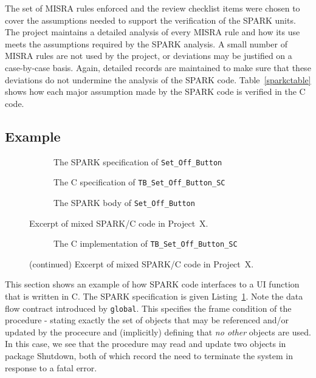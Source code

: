 \documentclass{llncs}
\newcommand{\spark}{SPARK\xspace}
\newcommand{\projectx}{Project~X\xspace}
\begin{document}
The set of MISRA rules enforced and the review checklist items
were chosen to cover the assumptions needed to support the
verification of the \spark units. The project maintains a detailed
analysis of every MISRA rule and how its use meets the assumptions
required by the \spark analysis. A small number of MISRA rules are
not used by the project, or deviations may be justified
on a case-by-case basis.  Again, detailed records are maintained
to make sure that these deviations do not undermine the analysis
of the \spark code. Table~\ref{sparkctable} shows how each major assumption
made by the \spark code is verified in the C code.

\subsection{Example}

\begin{figure}[p]
\begin{subfigure}{\linewidth}

\caption{The \spark specification of \texttt{Set\_Off\_Button}}
\label{fig:fragspec}
\end{subfigure}
\begin{subfigure}{\linewidth}
  
\caption{The C specification of \texttt{TB\_Set\_Off\_Button\_SC}}
\label{fig:fragh}
\end{subfigure}
\begin{subfigure}{\linewidth}

\caption{The \spark body of \texttt{Set\_Off\_Button}}
\label{fig:fragbody}
\end{subfigure}
\caption{Excerpt of mixed SPARK/C code in \projectx.}
\end{figure}
\begin{figure}[p]
\ContinuedFloat
\begin{subfigure}{\linewidth}

\caption{The C implementation of \texttt{TB\_Set\_Off\_Button\_SC}}
\label{fig:fragc}
\end{subfigure}
\caption{ (continued) Excerpt of mixed SPARK/C code in \projectx.}
\end{figure}

This section shows an example of how \spark code interfaces to a UI function
that is written in C. The \spark specification is given
Listing~\ref{fig:fragspec}.  Note the data flow contract introduced by \texttt{global}. This specifies the
frame condition of the procedure - stating
exactly the set of objects that may be referenced and/or updated by the
procecure and (implicitly) defining that \emph{no other} objects are used.  In
this case, we see that the procedure may read and update two objects in
package Shutdown, both of which record the need to terminate the system in
response to a fatal error.
\end{document}
